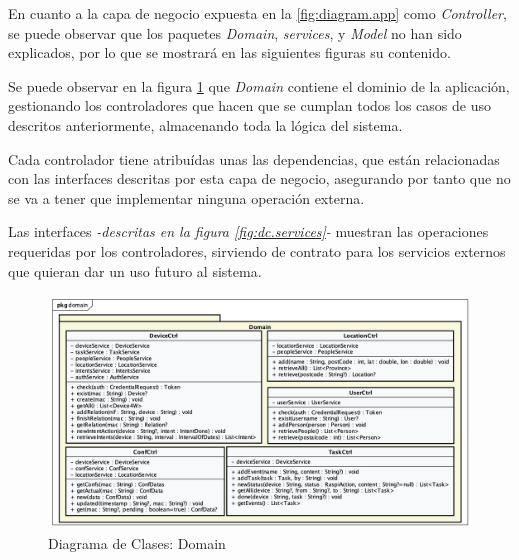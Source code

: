     En cuanto a la capa de negocio expuesta en la \ref{fig:diagram.app} como \textit{Controller}, se puede observar que los paquetes \textit{Domain}, \textit{services}, y \textit{Model} no han sido explicados, por lo que se mostrará en las siguientes figuras su contenido.
    
    Se puede observar en la figura \ref{fig:dc.domain} que \textit{Domain} contiene el dominio de la aplicación, gestionando los controladores que hacen que se cumplan todos los casos de uso descritos anteriormente, almacenando toda la lógica del sistema.
    
    Cada controlador tiene atribuídas unas las dependencias, que están relacionadas con las interfaces descritas por esta capa de negocio, asegurando por tanto que no se va a tener que implementar ninguna operación externa.

    Las interfaces \textit{-descritas en la figura \ref{fig:dc.services}-} muestran las operaciones requeridas por los controladores, sirviendo de contrato para los servicios externos que quieran dar un uso futuro al sistema.
    
    \begin{figure}[H]
        \centering
        \includegraphics[width=13cm]{./img/arch/back/dc.domain.png}
        \caption{Diagrama de Clases: Domain}
        \label{fig:dc.domain}
    \end{figure}
        
